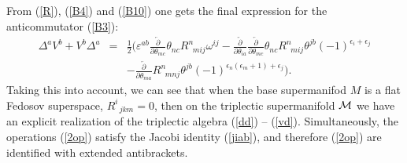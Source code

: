 \documentclass[a4paper,11pt]{article}
\begin{document}
\begin{appendix}
From (\ref{R}), (\ref{B4}) and (\ref{B10}) one gets the final
expression for the anticommutator (\ref{B3}):
\begin{eqnarray}
 \Delta^aV^b+V^b\Delta^a&=&\frac 12\Bigg(
\varepsilon^{ab}\frac{\overleftarrow{\partial}}{\partial\theta_{mc}}
\theta_{nc}R^n_{\;\;mij}\omega^{ij} -
\frac{\overleftarrow{\partial}}{\partial\theta_{ia}}
\frac{\overleftarrow{\partial}}{\partial\theta_{mc}}\theta_{nc}
R^n_{\;\;mij}\theta^{jb}(-1)^{\epsilon_i+\epsilon_j}\\
\nonumber
&&-\frac{\overleftarrow{\partial}}{\partial\theta_{ma}}
R^n_{\;\;mnj}\theta^{jb}(-1)^{\epsilon_n(\epsilon_m+1)+
\epsilon_j}\Bigg).
\end{eqnarray}
Taking this into account, we can see that when the base
supermanifod $M$ is a flat Fedosov superspace, $R^i_{\;\;jkm}=0$,
then on the triplectic supermanifold ${\cal M}$ we have an
explicit realization of the triplectic algebra (\ref{dd}) --
(\ref{vd}). Simultaneously, the operations (\ref{2op}) satisfy the
Jacobi identity (\ref{jiab}), and therefore (\ref{2op}) are
identified with extended antibrackets.

\end{appendix}
\end{document}
